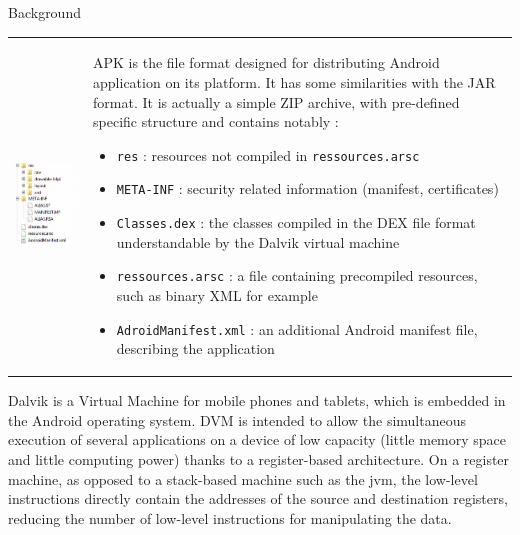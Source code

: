 \begin{chaptercover}{Background}
\begin{indentbox}{1cm}
\begin{tabular}{C{.3\linewidth}m{.66\linewidth}}
  \includegraphics[width=.35\textwidth]{figures/apk-file-structure}
   &
  APK is the file format designed for distributing Android application on its platform. It has some similarities with the JAR format. It is actually a simple ZIP archive, with pre-defined specific structure and contains notably :
  \begin{itemize}
    \item \texttt{res} :  resources not compiled in \texttt{ressources.arsc}
    \item \texttt{META-INF} : security related information (manifest, certificates)
    \item \texttt{Classes.dex} : the classes compiled in the DEX file format understandable by the Dalvik virtual machine
    \item \texttt{ressources.arsc} : a file containing precompiled resources, such as binary XML for example
    \item \texttt{AdroidManifest.xml} : an additional Android manifest file, describing the application
  \end{itemize}
  \\
\end{tabular}

Dalvik \cite{course-embedded-device} is a Virtual Machine for mobile phones and tablets, which is embedded in the Android operating system. DVM is intended to allow the simultaneous execution of several applications on a device of low capacity (little memory space and little computing power) thanks to a register-based architecture. On a register machine, as opposed to a stack-based machine such as the \acrshort{jvm}, the low-level instructions directly contain the addresses of the source and destination registers, reducing the number of low-level instructions for manipulating the data.


\end{indentbox}
\end{chaptercover}
